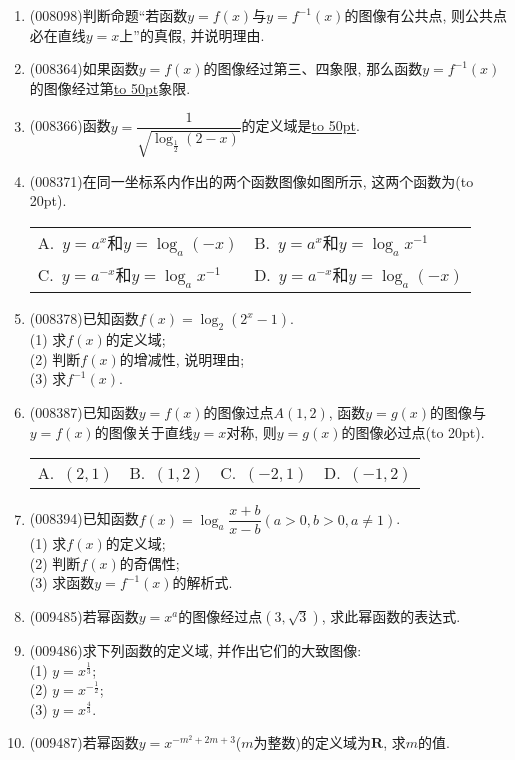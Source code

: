 \documentclass[10pt,a4paper]{article}
\newcommand{\blank}[1]{\underline{\hbox to #1pt{}}}
\newcommand{\bracket}[1]{(\hbox to #1pt{})}
\newcommand{\twoch}[4]{\par\begin{tabular}{p{.46\textwidth}p{.46\textwidth}}
A.~#1& B.~#2\\
C.~#3& D.~#4
\end{tabular}}
\newcommand{\fourch}[4]{\par\begin{tabular}{p{.23\textwidth}p{.23\textwidth}p{.23\textwidth}p{.23\textwidth}}
A.~#1 &B.~#2& C.~#3& D.~#4
\end{tabular}}
\begin{document}
\begin{enumerate}[1.]
\item {\tiny (008098)}判断命题``若函数$y=f(x)$与$y=f^{-1}(x)$的图像有公共点, 则公共点必在直线$y=x$上''的真假, 并说明理由.
\item {\tiny (008364)}如果函数$y=f(x)$的图像经过第三、四象限, 那么函数$y=f^{-1}(x)$的图像经过第\blank{50}象限.
\item {\tiny (008366)}函数$y=\dfrac 1{\sqrt {\log _{\frac 12}(2-x)}}$的定义域是\blank{50}.
\item {\tiny (008371)}在同一坐标系内作出的两个函数图像如图所示, 这两个函数为\bracket{20}.
\begin{center}
\end{center}
\twoch{$y=a^x$和$y=\log _a(-x)$}{$y=a^x$和$y=\log _ax^{-1}$}{$y=a^{-x}$和$y=\log _ax^{-1}$}{$y=a^{-x}$和$y=\log _a(-x)$}
\item {\tiny (008378)}已知函数$f(x)=\log _2(2^x-1)$.\\
(1) 求$f(x)$的定义域;\\
(2) 判断$f(x)$的增减性, 说明理由;\\
(3) 求$f^{-1}(x)$.
\item {\tiny (008387)}已知函数$y=f(x)$的图像过点$A(1,2)$, 函数$y=g(x)$的图像与$y=f(x)$的图像关于直线$y=x$对称, 则$y=g(x)$的图像必过点\bracket{20}.
\fourch{$(2,1)$}{$(1,2)$}{$(-2,1)$}{$(-1,2)$}
\item {\tiny (008394)}已知函数$f(x)=\log _a\dfrac{x+b}{x-b}(a>0,b>0, a\ne 1)$.\\
(1) 求$f(x)$的定义域;\\
(2) 判断$f(x)$的奇偶性;\\
(3) 求函数$y=f^{-1}(x)$的解析式.
\item {\tiny (009485)}若幂函数$y=x^a$的图像经过点$(3, \sqrt 3)$, 求此幂函数的表达式.
\item {\tiny (009486)}求下列函数的定义域, 并作出它们的大致图像:\\
(1) $y=x^{\frac 13}$;\\
(2) $y=x^{-\frac 12}$;\\
(3) $y=x^{\frac 43}$.
\item {\tiny (009487)}若幂函数$y=x^{-m^2+2m+3}$($m$为整数)的定义域为$\mathbf{R}$, 求$m$的值.

\end{enumerate}
\end{document}
